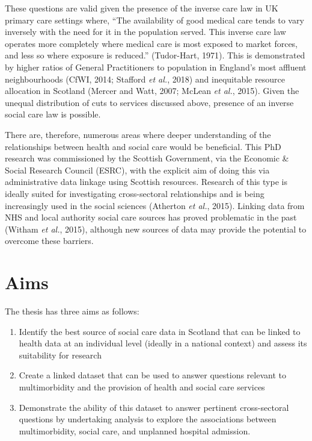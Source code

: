 \documentclass[12pt,a4paper,oneside,table]{report}
\begin{document}
These questions are valid given the presence of the inverse care law in
UK primary care settings where, ``The availability of good medical care
tends to vary inversely with the need for it in the population served.
This inverse care law operates more completely where medical care is
most exposed to market forces, and less so where exposure is reduced.''
(Tudor-Hart, 1971). This is demonstrated by higher ratios of General
Practitioners to population in England's most affluent neighbourhoods
(CfWI, 2014; Stafford \emph{et al.}, 2018) and inequitable resource
allocation in Scotland (Mercer and Watt, 2007; McLean \emph{et al.},
2015). Given the unequal distribution of cuts to services discussed
above, presence of an inverse social care law is possible.

There are, therefore, numerous areas where deeper understanding of the
relationships between health and social care would be beneficial. This
PhD research was commissioned by the Scottish Government, via the
Economic \& Social Research Council (ESRC), with the explicit aim of
doing this via administrative data linkage using Scottish resources.
Research of this type is ideally suited for investigating cross-sectoral
relationships and is being increasingly used in the social sciences
(Atherton \emph{et al.}, 2015). Linking data from NHS and local
authority social care sources has proved problematic in the past (Witham
\emph{et al.}, 2015), although new sources of data may provide the
potential to overcome these barriers.

\section{Aims}\label{sec:intro-aims-obs}

The thesis has three aims as follows:

\begin{enumerate}[noitemsep]
\item Identify the best source of social care data in Scotland that can be linked to health data at an individual level (ideally in a national context) and assess its suitability for research
\item Create a linked dataset that can be used to answer questions relevant to multimorbidity and the provision of health and social care services 
\item Demonstrate the ability of this dataset to answer pertinent cross-sectoral questions by undertaking analysis to explore the associations between multimorbidity, social care, and unplanned hospital admission.
\end{enumerate}
\end{document}
